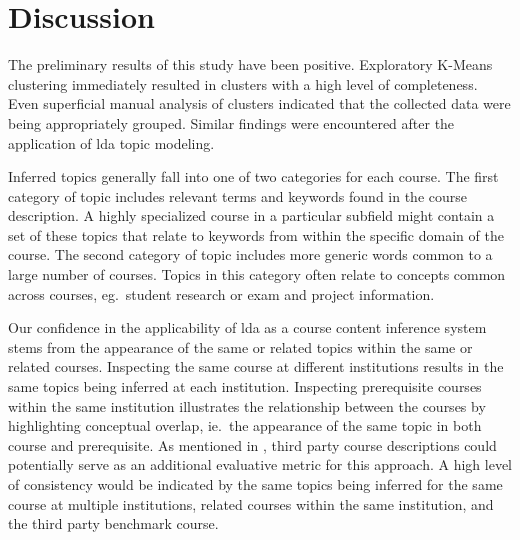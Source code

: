 \section{Discussion}
\label{sec:discussion}


The preliminary results of this study have been positive.
Exploratory K-Means clustering immediately resulted in clusters with a high level of completeness.
Even superficial manual analysis of clusters indicated that the collected data were being appropriately grouped.
Similar findings were encountered after the application of \ac{lda} topic modeling.


Inferred topics generally fall into one of two categories for each course.
The first category of topic includes relevant terms and keywords found in the course description.
A highly specialized course in a particular subfield might contain a set of these topics that relate to keywords from within the specific domain of the course.
The second category of topic includes more generic words common to a large number of courses.
Topics in this category often relate to concepts common across courses, eg.\ student research or exam and project information.


Our confidence in the applicability of \ac{lda} as a course content inference system stems from the appearance of the same or related topics within the same or related courses.
Inspecting the same course at different institutions results in the same topics being inferred at each institution.
Inspecting prerequisite courses within the same institution illustrates the relationship between the courses by highlighting conceptual overlap, ie.\ the appearance of the same topic in both course and prerequisite.
As mentioned in , third party course descriptions could potentially serve as an additional evaluative metric for this approach.
A high level of consistency would be indicated by the same topics being inferred for the same course at multiple institutions, related courses within the same institution, and the third party benchmark course.


